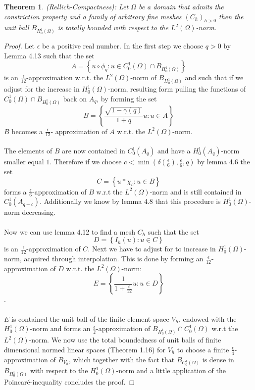 \documentclass[11pt,a4paper,leqno]{report}
\newtheorem{theorem}{Theorem}[chapter]
\numberwithin{equation}{chapter}
\begin{document}
\begin{theorem}(Rellich-Compactness): Let $\Omega$ be a domain that admits the constriction property and a family of arbitrary fine meshes $(C_h)_{h>0}$ then the unit ball $B_{H^1_0(\Omega)}$ is totally bounded with respect to the $L^2(\Omega)$-norm.
\end{theorem}
\begin{proof} Let $\epsilon$ be a positive real number. In the first step we choose $q>0$ by Lemma 4.13 such that the set 
\begin{equation*} A=\left\{u\circ\phi_q:u\in C^1_0(\Omega)\cap B_{H^1_0(\Omega)}\right\}\end{equation*}
is an $\frac{\epsilon}{12}$-approximation w.r.t. the $L^2(\Omega)$-norm of $B_{H^1_0(\Omega)}$ and such that if we adjust for the increase in $H^1_0(\Omega)$-norm, resulting form pulling the functions of $C^1_0(\Omega)\cap B_{H^1_0(\Omega)}$ back on $A_q$, by forming the set 
\begin{equation*} B=\left\{ \frac{\sqrt{1-\gamma(q)}}{1+q}u:u\in A\right\}\end{equation*}$B$ becomes a $\frac{\epsilon}{12}$- approximation of $A$ w.r.t. the $L^2(\Omega)$-norm.\\
\\
The elements of $B$ are now contained in $C^1_0(A_q)$ and have a $H^1_0(A_q)$-norm smaller equal $1$. Therefore if we choose $c<\min(\delta(\frac{\epsilon}{6}),\frac{\epsilon}{6},q)$ by lemma 4.6 the set \begin{equation*}C=\left\{u*\chi_c:u\in B\right\}\end{equation*} forms a $\frac{\epsilon}{6}$-approximation of $B$ w.r.t the $L^2(\Omega)$-norm and is still contained in $C^1_0(A_{q-c})$. Additionally we know by lemma 4.8 that this procedure is $H^1_0(\Omega)$-norm decreasing.\\
\\
Now we can use lemma 4.12 to find a mesh $C_h$ such that the set \begin{equation*}D=\left\{I_h(u):u\in C\right\}\end{equation*} is an $\frac{\epsilon}{12}$-approximation of $C$.
Next we have to adjust for to increase in $H^1_0(\Omega)$-norm, acquired through interpolation. This is done by forming  an $\frac{\epsilon}{12}$-approximation of $D$ w.r.t. the $L^2(\Omega)$-norm:
\begin{equation*}E=\left\{\frac{1}{1+\frac{\epsilon}{12}}u:u\in D\right\}\end{equation*}. \\
\\
$E$ is contained the unit ball of the finite element space $V_h$, endowed with the $H^1_0(\Omega)$-norm and forms an $\frac{\epsilon}{2}$-approximation of $B_{H^1_0(\Omega)}\cap C^1_0(\Omega)$ w.r.t the $L^2(\Omega)$-norm. We now use the total boundedness of unit balls of finite dimensional normed linear spaces (Theorem 1.16) for $V_h$ to choose a finite $\frac{\epsilon}{4}$-approximation of $B_{V_h}$, which together with the fact that $B_{C^1_0(\Omega)}$ is dense in $B_{H^1_0(\Omega)}$ with respect to the $H^1_0(\Omega)$-norm and a little application of the Poincar\'{e}-inequality concludes the proof.
\end{proof}
\end{document}
